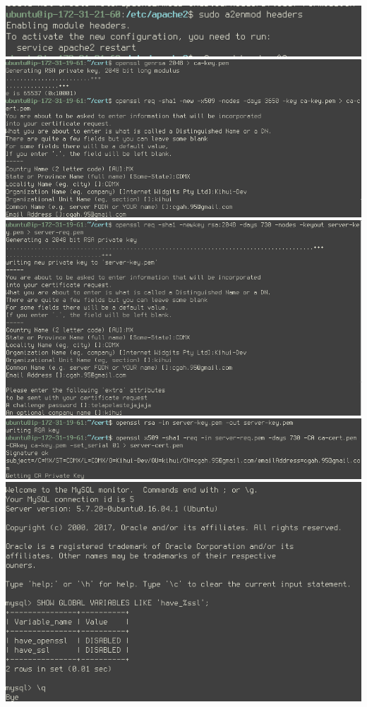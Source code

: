 \documentclass[9pt]{article}
\begin{document}
\includegraphics[width=\textwidth]{mods}
\includegraphics[width=\textwidth]{mysql_cert}
\includegraphics[width=\textwidth]{mysql_server-key}
\includegraphics[width=\textwidth]{mysql_server-cert}
\includegraphics[width=\textwidth]{mysql_ssl-disabled}
\end{document}
